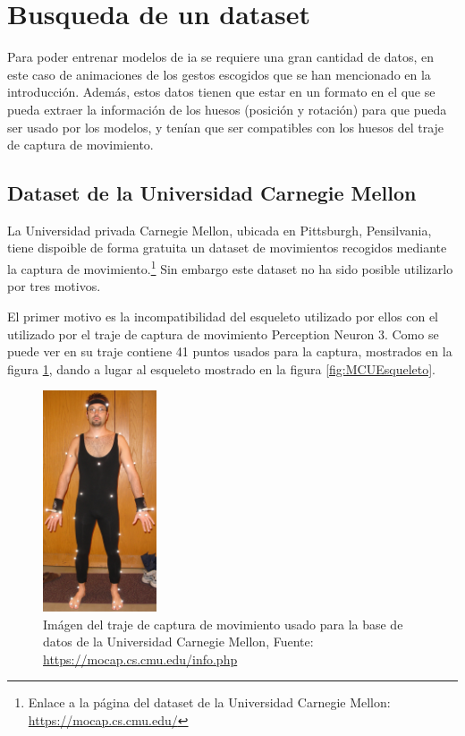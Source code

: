 \section{Busqueda de un dataset}
\label{sec:busquedaDataset}
Para poder entrenar modelos de \gls{ia} se requiere una gran cantidad de datos, en este caso de animaciones de los gestos escogidos que se han mencionado en la introducción.
Además, estos datos tienen que estar en un formato en el que se pueda extraer la información de los huesos (posición y rotación) para que pueda ser usado por los modelos, y tenían que ser compatibles con los huesos del traje de captura de movimiento.

\subsection{Dataset de la Universidad Carnegie Mellon}
La Universidad privada Carnegie Mellon, ubicada en Pittsburgh, Pensilvania, tiene dispoible de forma gratuita un dataset de movimientos recogidos mediante la captura de movimiento.\footnote{Enlace a la página del dataset de la Universidad Carnegie Mellon: \url{https://mocap.cs.cmu.edu/}}
Sin embargo este dataset no ha sido posible utilizarlo por tres motivos.

El primer motivo es la incompatibilidad del esqueleto utilizado por ellos con el utilizado por el traje de captura de movimiento Perception Neuron 3.
Como se puede ver en \cite{MCUINFO} su traje contiene 41 puntos usados para la captura, mostrados en la figura \ref{fig:MCUTraje}, dando a lugar al esqueleto mostrado en la figura \ref{fig:MCUEsqueleto}.

\begin{figure}[H]
    \centering
    \includegraphics[width=0.3\textwidth]{Imagenes/Bitmap/MCUTraje.jpg}
    \caption{Imágen del traje de captura de movimiento usado para la base de datos de la Universidad Carnegie Mellon, Fuente: \url{https://mocap.cs.cmu.edu/info.php}}
    \label{fig:MCUTraje}
\end{figure}

